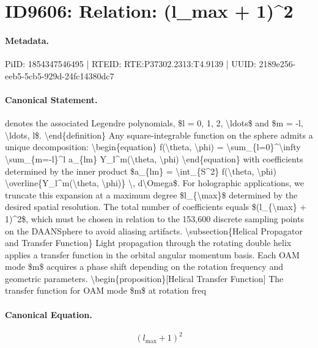 \section*{ID9606: Relation: (l\_max + 1)\textasciicircum{}2}
\paragraph{Metadata.}
PiID: 1854347546495 | RTEID: RTE:P37302.2313:T4.9139 | UUID: 2189e256-eeb5-5cb5-929d-24fc14380dc7

\paragraph{Canonical Statement.}
denotes the associated Legendre polynomials, \$l = 0, 1, 2, \textbackslash{}ldots\$ and \$m = -l, \textbackslash{}ldots, l\$. \textbackslash{}end\{definition\} Any square-integrable function on the sphere admits a unique decomposition: \textbackslash{}begin\{equation\} f(\textbackslash{}theta, \textbackslash{}phi) = \textbackslash{}sum\_\{l=0\}\textasciicircum{}\textbackslash{}infty \textbackslash{}sum\_\{m=-l\}\textasciicircum{}l a\_\{lm\} Y\_l\textasciicircum{}m(\textbackslash{}theta, \textbackslash{}phi) \textbackslash{}end\{equation\} with coefficients determined by the inner product \$a\_\{lm\} = \textbackslash{}int\_\{S\textasciicircum{}2\} f(\textbackslash{}theta, \textbackslash{}phi) \textbackslash{}overline\{Y\_l\textasciicircum{}m(\textbackslash{}theta, \textbackslash{}phi)\} \textbackslash{}, d\textbackslash{}Omega\$. For holographic applications, we truncate this expansion at a maximum degree \$l\_\{\textbackslash{}max\}\$ determined by the desired spatial resolution. The total number of coefficients equals \$(l\_\{\textbackslash{}max\} + 1)\textasciicircum{}2\$, which must be chosen in relation to the 153,600 discrete sampling points on the DAANSphere to avoid aliasing artifacts. \textbackslash{}subsection\{Helical Propagator and Transfer Function\} Light propagation through the rotating double helix applies a transfer function in the orbital angular momentum basis. Each OAM mode \$m\$ acquires a phase shift depending on the rotation frequency and geometric parameters. \textbackslash{}begin\{proposition\}[Helical Transfer Function] The transfer function for OAM mode \$m\$ at rotation freq

\paragraph{Canonical Equation.}
\[
(l_{\max} + 1)^2
\]

